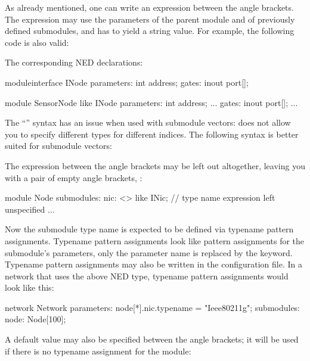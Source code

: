 As already mentioned, one can write an expression between the angle
brackets. The expression may use the parameters of the parent module and of
previously defined submodules, and has to yield a string value. For
example, the following code is also valid:

\begin{ned}
network Net6
{
    parameters:
        string nodeTypePrefix;
        int variant;
    submodules:
        node[6]: <nodeTypePrefix + "Node" + string(variant)> like INode {
           ...
}
\end{ned}

The corresponding NED declarations:

\begin{ned}
moduleinterface INode
{
    parameters:
        int address;
    gates:
        inout port[];
}

module SensorNode like INode
{
    parameters:
        int address;
        ...
    gates:
        inout port[];
        ...
}
\end{ned}

The ``'' syntax has an issue when used
with submodule vectors: does not allow you to specify different types
for different indices. The following syntax is better suited for
submodule vectors:

The expression between the angle brackets may be left out altogether,
leaving you with a pair of empty angle brackets, \ttt{<>}:

\begin{ned}
module Node
{
    submodules:
        nic: <> like INic;  // type name expression left unspecified
        ...
}
\end{ned}

Now the submodule type name is expected to be defined via typename pattern
assignments. Typename pattern assignments look like pattern assignments for
the submodule's parameters, only the parameter name is replaced by the
 keyword. Typename pattern assignments may also be
written in the configuration file. In a network that uses the above
 NED type, typename pattern assignments would look like this:

\begin{ned}
network Network
{
    parameters:
        node[*].nic.typename = "Ieee80211g";
    submodules:
        node: Node[100];
}
\end{ned}

A default value may also be specified between the angle brackets;
it will be used if there is no typename assignment for the
module:

